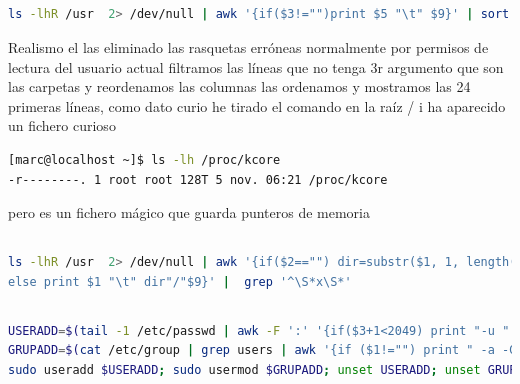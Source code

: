 \documentclass[preprint,11pt]{elsarticle}
\begin{document}
\subsection{}
\begin{lstlisting}[language=bash,  basicstyle=\tiny,]
ls -lhR /usr  2> /dev/null | awk '{if($3!="")print $5 "\t" $9}' | sort -rh | head -24

\end{lstlisting}

Realismo el las eliminado las rasquetas erróneas normalmente por permisos de lectura del usuario actual filtramos las líneas que no tenga 3r argumento que son las carpetas y reordenamos las columnas las ordenamos y mostramos las 24 primeras líneas, como dato curio he tirado el comando en la raíz / i ha aparecido un fichero curioso 
\begin{lstlisting}[language=bash,  basicstyle=\tiny,]
[marc@localhost ~]$ ls -lh /proc/kcore
-r--------. 1 root root 128T 5 nov. 06:21 /proc/kcore

\end{lstlisting}
pero es un fichero mágico que guarda punteros de memoria

\subsection{}
\begin{lstlisting}[language=bash,  basicstyle=\tiny,]
ls -lhR /usr  2> /dev/null | awk '{if($2=="") dir=substr($1, 1, length($1)-1);
else print $1 "\t" dir"/"$9}' |  grep '^\S*x\S*'

\end{lstlisting}

\subsection{}
\begin{lstlisting}[language=bash,  basicstyle=\tiny,]
USERADD=$(tail -1 /etc/passwd | awk -F ':' '{if($3+1<2049) print "-u " $3+1 " marc2"; else print "uid > 2048" }');
GRUPADD=$(cat /etc/group | grep users | awk '{if ($1!="") print " -a -G users marc2"; else sudo groupadd users}');
sudo useradd $USERADD; sudo usermod $GRUPADD; unset USERADD; unset GRUPADD 

\end{lstlisting}

\clearpage
\end{document}
